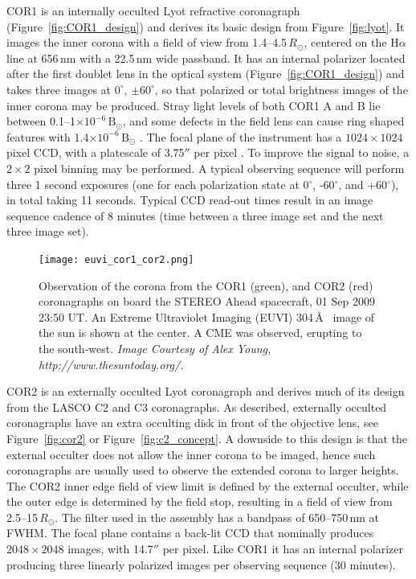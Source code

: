 COR1 is an internally occulted Lyot refractive coronagraph (Figure~\ref{fig:COR1_design}) and derives its basic design from Figure~\ref{fig:lyot}. It images the inner corona with a field of view from 1.4--4.5\,$R_{\odot}$, centered on the H$\alpha$ line at 656\,nm with a 22.5\,nm wide passband. 
It has an internal polarizer located after the first doublet lens in the optical system (Figure~\ref{fig:COR1_design}) and takes three images at $0^{\circ}$, $\pm60^{\circ}$, so that polarized or total brightness images of the inner corona may be produced. Stray light levels of both COR1 A and B lie between 0.1--1$\times10^{-6}\,\mathrm{B}_{\odot}$, and some defects in the field lens can cause ring shaped features with 1.4$\times10^{-6}\,\mathrm{B}_{\odot}$ \citep{how08}. The focal plane of the instrument has a $1024\times1024$ pixel CCD, with a platescale of 3.75$''$ per pixel \citep{thomp2008}. To improve the signal to noise, a $2\times2$ pixel binning may be performed. A typical observing sequence will perform three 1 second exposures (one for each polarization state at 0$^{\circ}$, -60$^{\circ}$, and +60$^{\circ}$), in total taking 11 seconds. Typical CCD read-out times result in an image sequence cadence of 8 minutes (time between a three image set and the next three image set).
\begin{figure}[!t]
\begin{center}
\texttt{[image: euvi\_cor1\_cor2.png]}
\caption[COR1 and COR2 observations]{Observation of the corona from the COR1 (green), and COR2 (red) coronagraphs on board the STEREO Ahead spacecraft, 01 Sep 2009 23:50 UT. An Extreme Ultraviolet Imaging (EUVI) 304\,\AA~ image of the sun is shown at the center. A CME was observed, erupting to the south-west. {\it Image Courtesy of Alex Young, http://www.thesuntoday.org/.} }
\label{fig:cor1cor2}
\end{center}
\end{figure}

COR2 is an externally occulted Lyot coronagraph and derives much of its design from the LASCO C2 and C3 coronagraphs. {\color{blue}As described,} externally occulted coronagraphs have an extra occulting disk in front of the objective lens, see Figure~\ref{fig:cor2} or Figure~\ref{fig:c2_concept}. A downside to this design is that the external occulter does not allow the inner corona to be imaged, hence such coronagraphs are usually used to observe the extended corona to larger heights. The COR2 inner edge field of view limit is defined by the external occulter, while the outer edge is determined by the field stop, resulting in a field of view from 2.5--15$\,R_{\odot}$. The filter used in the assembly has a bandpass of 650--750\,nm at FWHM. The focal plane contains a back-lit CCD that nominally produces $2048\times2048$ images, with 14.7$''$ per pixel. Like COR1 it has an internal polarizer producing three linearly polarized images per observing sequence (30 minutes).

